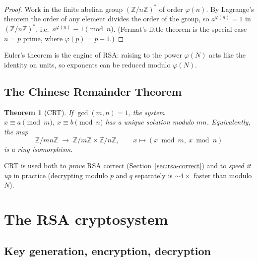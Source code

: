 \documentclass[11pt]{article}
\theoremstyle{plain}
\newtheorem{theorem}{Theorem}[section]
\theoremstyle{definition}
\theoremstyle{remark}
\newcommand{\Z}{\mathbb{Z}}
\newcommand{\Zn}{(\Z/n\Z)^{\!*}}
\begin{document}
\begin{proof}
Work in the finite abelian group $\Zn$ of order $\varphi(n)$. By Lagrange's theorem the
order of any element divides the order of the group, so $a^{\varphi(n)}=1$ in $\Zn$,
i.e.\ $a^{\varphi(n)}\equiv 1 \pmod n$. (Fermat's little theorem is the special case
$n=p$ prime, where $\varphi(p)=p-1$.) \end{proof}

Euler's theorem is the engine of RSA: raising to the power $\varphi(N)$ acts like the
identity on units, so exponents can be reduced modulo $\varphi(N)$.

\subsection{The Chinese Remainder Theorem}

\begin{theorem}[CRT]\label{thm:crt}
If $\gcd(m,n)=1$, the system $x\equiv a \pmod m,\ x\equiv b \pmod n$ has a unique
solution modulo $mn$. Equivalently, the map
\[
  \Z/mn\Z \;\longrightarrow\; \Z/m\Z \times \Z/n\Z, \qquad
  x \longmapsto (x \bmod m,\ x\bmod n)
\]
is a ring isomorphism.
\end{theorem}

CRT is used both to \emph{prove} RSA correct (Section~\ref{sec:rsa-correct}) and to
\emph{speed it up} in practice (decrypting modulo $p$ and $q$ separately is $\sim 4\times$
faster than modulo $N$).

\section{The RSA cryptosystem}

\subsection{Key generation, encryption, decryption}
\end{document}
